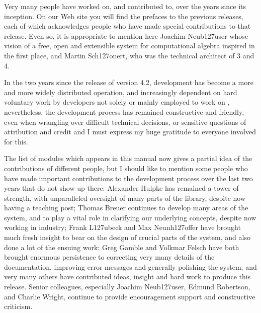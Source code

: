 
Very many people have worked on, and contributed to, {\GAP} over the
years since its inception. On our Web site you will find the prefaces
to the previous releases, each of which acknowledges people who have
made special contributions to that release. Even so, it is appropriate
to mention here Joachim Neub\accent127user whose vision of a free,
open and extensible system for computational algebra inspired {\GAP}
in the first place, and Martin Sch\accent127onert, who was the
technical architect of {\GAP} 3 and {\GAP} 4.

In the two years since the release of version 4.2, {\GAP} development
has become a more and more widely distributed operation, and
increasingly dependent on hard voluntary work by developers not solely
or mainly employed to work on {\GAP}, nevertheless, the development
process has remained constructive and friendly, even when wrangling
over difficult technical decisions, or sensitive questions of
attribution and credit and I must express my huge gratitude to
everyone involved for this.

The list of modules which appears in this manual now gives a partial
idea of the contributions of different people, but I should like to
mention some people who have made important contributions to the
development process over the last two years that do not show up there:
Alexander Hulpke has remained a tower of strength, with unparalleled
oversight of many parts of the library, despite now having a teaching
post; Thomas Breuer continues to develop many areas of the system, and
to play a vital role in clarifying our underlying concepts, despite
now working in industry; Frank L\accent127ubeck and Max
Neunh\accent127offer have brought much fresh insight to bear on the
design of crucial parts of the system, and also done a lot of the
ensuing work; Greg Gamble and Volkmar Felsch have both brought
enormous persistence to correcting very many details of the
documentation, improving error messages and generally polishing the
system; and very many others have contributed ideas, insight and hard
work to produce this release. Senior colleagues, especially Joachim
Neub\accent127user, Edmund Robertson, and Charlie Wright, continue to
provide encouragement support and constructive criticism.





